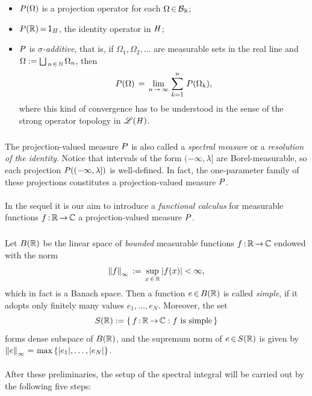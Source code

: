 \documentclass[11pt,twoside]{article}
\begin{document}
\begin{itemize}[leftmargin=30pt]
\item[(P-1)]
${P}(\Omega)$ is a projection operator for each $\Omega {\,\in\,} {\mathcal{B}}_{{\mathbb{R}}}$;

\item[(P-2)]
${P}({\mathbb{R}}) {\,=\,} {\mathsf{1}}_{\mathit{H}}$, the identity operator in $\mathit{H}$;

\item[(P-3)]
${P}$ is \textit{$\sigma$-additive},
that is,
if $\Omega_1, \Omega_2,\ldots$ are measurable sets in the real line
and $\Omega := \bigsqcup_{\,n {\,\in\,} {\mathbb{N}}} \Omega_n$,
then
\[
{P}(\Omega) \,=\, \lim_{n {\,\to\,} \infty} \, \sum_{k=1}^n \, {P}(\Omega_k),
\]
where this kind of convergence has to be understood
in the sense of the strong operator topology in $\mathscr{L}(\mathit{H})$.
\end{itemize}

\subparagraph*{}
The projection-valued measure ${P}$ is also called
a \textit{spectral measure} or a \textit{resolution of the identity}.
Notice that
intervals of the form $(-\infty,\lambda]$ are Borel-measurable,
so each projection ${P}((-\infty,\lambda])$ is well-defined.
In fact,
the one-parameter family of these projections constitutes
a projection-valued measure ${P}$.

\paragraph*{}
In the sequel
it is our aim to introduce a \textit{functional calculus}
for measurable functions $f{\,:\,}{\mathbb{R}} {\,\to\,} {\mathbb{C}}$
{\wrt} a projection-valued measure ${P}$.

\subparagraph*{}
Let $B({\mathbb{R}})$ be the linear space of \textit{bounded} measurable functions
$f{\,:\,}{\mathbb{R}} {\,\to\,} {\mathbb{C}}$ endowed with the norm
\[
\norm{f}_{\infty} \eqdef \sup_{x \xeof \R} \, \abs{f(x) } < \infty,
\]
which in fact is a Banach space.
Then a function $e {\,\in\,} B({\mathbb{R}})$ is called \textit{simple},
if it adopts only finitely many values $e_1,\ldots, e_N$.
Moreover, the set
\[
S({\mathbb{R}}) := \{\,f {\,:\,} {\mathbb{R}} {\,\to\,} {\mathbb{C}}: f \mbox{ is simple}\,\}
\]
forms dense subspace of $B({\mathbb{R}})$,
and the supremum norm of $e {\,\in\,} S({\mathbb{R}})$ is given by
$\norm{e}_{\infty} \eq \max \, \{\abs{e_1} ,\ldots, \abs{e_N} \}$.

\paragraph*{}
After these preliminaries,
the setup of the spectral integral will be carried out
by the following five steps:
\end{document}
